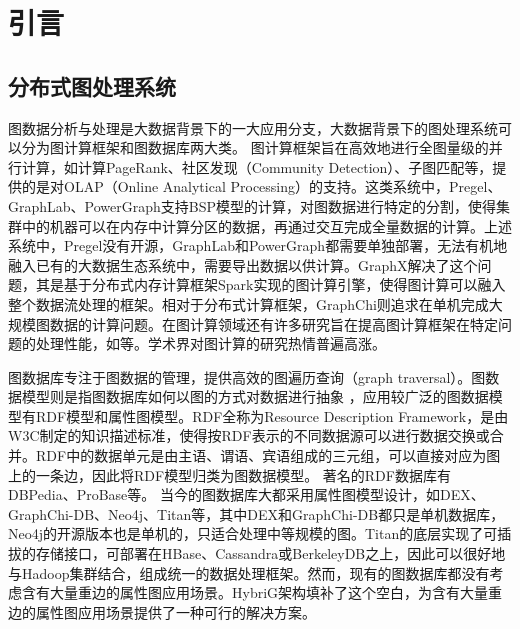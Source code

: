 
\chapter{引言}

\section{分布式图处理系统}
图数据分析与处理是大数据背景下的一大应用分支\supercite{big_data}，大数据背景下的图处理系统可以分为图计算框架和图数据库两大类。
图计算框架旨在高效地进行全图量级的并行计算，如计算PageRank\supercite{pagerank}、社区发现\supercite{community_detection}（Community Detection）、子图匹配\supercite{subgraph_listing}等，提供的是对OLAP（Online Analytical Processing）的支持。这类系统中，Pregel\supercite{pregel}、GraphLab\supercite{graphlab}、PowerGraph\supercite{powergraph}支持BSP\supercite{BSP}模型的计算，对图数据进行特定的分割，使得集群中的机器可以在内存中计算分区的数据，再通过交互完成全量数据的计算。上述系统中，Pregel没有开源，GraphLab和PowerGraph都需要单独部署，无法有机地融入已有的大数据生态系统中，需要导出数据以供计算。GraphX\supercite{graphx}解决了这个问题，其是基于分布式内存计算框架Spark\supercite{spark}实现的图计算引擎，使得图计算可以融入整个数据流处理的框架。相对于分布式计算框架，GraphChi\supercite{graphchi}则追求在单机完成大规模图数据的计算问题。在图计算领域还有许多研究旨在提高图计算框架在特定问题的处理性能，如\supercites{xuning_LogGP,xuning_2,shaoxia_1,shaoxia_2,shaoxia_3}等。学术界对图计算的研究热情普遍高涨。

图数据库专注于图数据的管理，提供高效的图遍历查询（graph traversal）。图数据模型则是指图数据库如何以图的方式对数据进行抽象 \supercite{graph_models_survey}，应用较广泛的图数据模型有RDF模型和属性图模型。RDF全称为Resource Description Framework，是由W3C制定的知识描述标准，使得按RDF表示的不同数据源可以进行数据交换或合并。RDF中的数据单元是由主语、谓语、宾语组成的三元组，可以直接对应为图上的一条边，因此将RDF模型归类为图数据模型。
著名的RDF数据库有DBPedia、ProBase等。
当今的图数据库大都采用属性图模型设计\supercite{graph_database_models}，如DEX\supercite{DEX}、GraphChi-DB\supercite{graphchi-db}、Neo4j、Titan等，其中DEX和GraphChi-DB都只是单机数据库，Neo4j的开源版本也是单机的，只适合处理中等规模的图。Titan的底层实现了可插拔的存储接口，可部署在HBase、Cassandra或BerkeleyDB之上，因此可以很好地与Hadoop集群结合，组成统一的数据处理框架。然而，现有的图数据库都没有考虑含有大量重边的属性图应用场景。HybriG架构填补了这个空白，为含有大量重边的属性图应用场景提供了一种可行的解决方案。

